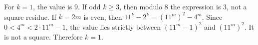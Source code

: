 For $k=1$, the value is $9$. If odd $k\ge3$, then modulo $8$ the expression is $3$, not a square residue. If $k=2m$ is even, then $11^k-2^k=(11^m)^2-4^m$. Since $0<4^m<2\cdot11^m-1$, the value lies strictly between $(11^m-1)^2$ and $(11^m)^2$. It is not a square. Therefore $\boxed{k=1}$.
